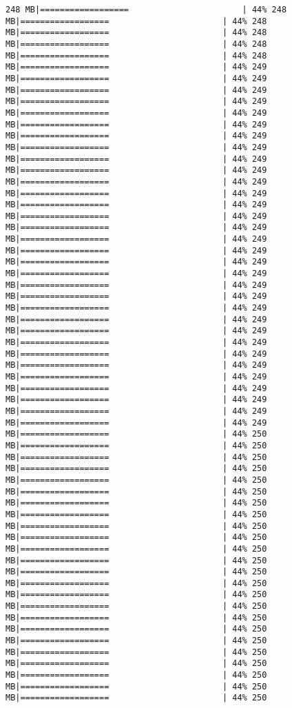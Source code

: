 \documentclass[
]{article}
\begin{document}
\begin{verbatim}
248 MB|==================                       | 44% 248 MB|==================                       | 44% 248 MB|==================                       | 44% 248 MB|==================                       | 44% 248 MB|==================                       | 44% 248 MB|==================                       | 44% 249 MB|==================                       | 44% 249 MB|==================                       | 44% 249 MB|==================                       | 44% 249 MB|==================                       | 44% 249 MB|==================                       | 44% 249 MB|==================                       | 44% 249 MB|==================                       | 44% 249 MB|==================                       | 44% 249 MB|==================                       | 44% 249 MB|==================                       | 44% 249 MB|==================                       | 44% 249 MB|==================                       | 44% 249 MB|==================                       | 44% 249 MB|==================                       | 44% 249 MB|==================                       | 44% 249 MB|==================                       | 44% 249 MB|==================                       | 44% 249 MB|==================                       | 44% 249 MB|==================                       | 44% 249 MB|==================                       | 44% 249 MB|==================                       | 44% 249 MB|==================                       | 44% 249 MB|==================                       | 44% 249 MB|==================                       | 44% 249 MB|==================                       | 44% 249 MB|==================                       | 44% 249 MB|==================                       | 44% 249 MB|==================                       | 44% 249 MB|==================                       | 44% 249 MB|==================                       | 44% 249 MB|==================                       | 44% 249 MB|==================                       | 44% 250 MB|==================                       | 44% 250 MB|==================                       | 44% 250 MB|==================                       | 44% 250 MB|==================                       | 44% 250 MB|==================                       | 44% 250 MB|==================                       | 44% 250 MB|==================                       | 44% 250 MB|==================                       | 44% 250 MB|==================                       | 44% 250 MB|==================                       | 44% 250 MB|==================                       | 44% 250 MB|==================                       | 44% 250 MB|==================                       | 44% 250 MB|==================                       | 44% 250 MB|==================                       | 44% 250 MB|==================                       | 44% 250 MB|==================                       | 44% 250 MB|==================                       | 44% 250 MB|==================                       | 44% 250 MB|==================                       | 44% 250 MB|==================                       | 44% 250 MB|==================                       | 44% 250 MB|==================                       | 44% 250 
\end{verbatim}
\end{document}
